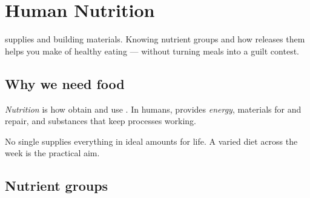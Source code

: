 \chapter{Human Nutrition}\label{ch:g6:nutrition}

 supplies  and building materials. Knowing nutrient groups and
how  releases them helps you make  of healthy eating ---
without turning meals into a guilt contest.

\section{Why we need food}

\begin{definition}[Nutrition]\label{def:g6:nutrition:def}
\emph{Nutrition} is how  obtain and use .
In humans,  provides \emph{energy}, materials
for  and repair, and substances that keep processes working.
\end{definition}

\begin{proposition}\label{prop:g6:nutrition:balance}
No single  supplies everything in ideal amounts for life. A varied
diet across the week is the practical aim.
\end{proposition}
\admitted

\section{Nutrient groups}

